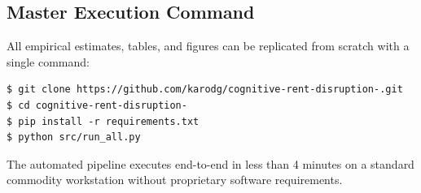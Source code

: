 \documentclass[12pt]{article}
\begin{document}
\subsection{Master Execution Command}

All empirical estimates, tables, and figures can be replicated from scratch with a single command:
\begin{verbatim}
$ git clone https://github.com/karodg/cognitive-rent-disruption-.git
$ cd cognitive-rent-disruption-
$ pip install -r requirements.txt
$ python src/run_all.py
\end{verbatim}
The automated pipeline executes end-to-end in less than 4 minutes on a standard commodity workstation without proprietary software requirements.
\end{document}
